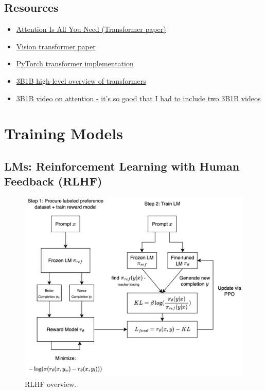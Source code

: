 \documentclass[12pt]{article}
\begin{document}
\subsection{Resources}
\begin{itemize}
  \item \href{https://arxiv.org/pdf/1706.03762}{Attention Is All You Need (Transformer paper)}
  
  \item \href{https://arxiv.org/abs/2010.11929}{Vision transformer paper}

  \item \href{https://github.com/hyunwoongko/transformer}{PyTorch transformer implementation}
  
  \item \href{https://www.youtube.com/watch?v=wjZofJX0v4M}{3B1B high-level overview of transformers}
  
  \item \href{https://www.youtube.com/watch?v=eMlx5fFNoYc}{3B1B video on attention - it's so good that I had to include two 3B1B videos}
  
\end{itemize}

\section{Training Models}

\subsection{LMs: Reinforcement Learning with Human Feedback (RLHF)}

\begin{figure}[H]
    \centering
    \includegraphics[width=1\textwidth]{../media/rlhf_light.png}
    \caption{RLHF overview. }
    \label{fig:rlhf}
\end{figure}
\end{document}
